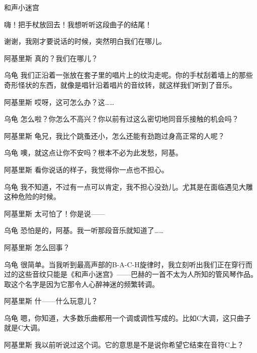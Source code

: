 \begin{dialog}{和声小迷宫}
\begin{dialogue}
\begin{dialogue}
\begin{dialogue}
\begin{dialogue}
      嗨！把手杖放回去！我想听听这段曲子的结尾！


      谢谢，我刚才要说话的时候，突然明白我们在哪儿。

      \item[阿基里斯]真的？我们在哪儿？

      \item[乌龟]我们正沿着一张放在套子里的唱片上的纹沟走呢。你的手杖刮着墙上的那些奇形怪状的东西，就像是唱针沿着唱片的音纹转，就这样我们听到了音乐。

      \item[阿基里斯]哎呀，这可怎么办？这……

      \item[乌龟]怎么啦？你怎么不高兴？你以前有过这么密切地同音乐接触的机会吗？

      \item[阿基里斯]龟兄，我比个跳蚤还小，怎么还能有劲跑过身高正常的人呢？

      \item[乌龟]噢，就这点让你不安吗？根本不必为此发愁，阿基。

      \item[阿基里斯]看你说话的样子，我觉得你一点也不担心。

      \item[乌龟]我不知道，不过有一点可以肯定，我不担心没劲儿。尤其是在面临遇见大雕这种危险的时候。

      \item[阿基里斯]太可怕了！你是说——

      \item[乌龟]恐怕是的，阿基。我一听那段音乐就知道了……

      \item[阿基里斯]怎么回事？

      \item[乌龟]很简单。当我听到最高声部的B-A-C-H旋律时，我立刻听出我们正在穿行而过的这些音纹只能是《和声小迷宫》{}——巴赫的一首不太为人所知的管风琴作品。取这个名字是因为它那令人心醉神迷的频繁转调。

      \item[阿基里斯]什——什么玩意儿？

      \item[乌龟]嗯，你知道，大多数乐曲都用一个调或调性写成的。比如C大调，这只曲子就是C大调。

      \item[阿基里斯]我以前听说过这个词。它的意思是不是说你希望它结束在音符C上？


\end{dialogue}
\end{dialogue}
\end{dialogue}
\end{dialogue}
\end{dialog}
